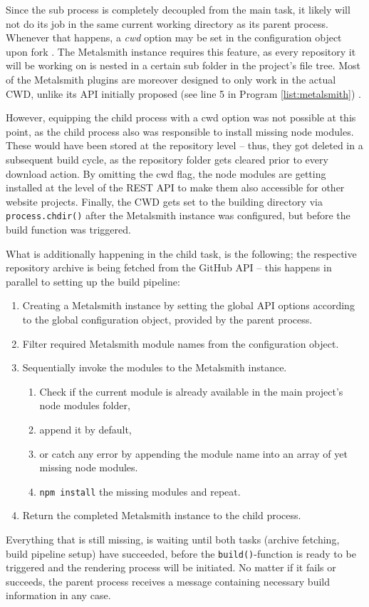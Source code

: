 Since the sub process is completely decoupled from the main task, it likely will not do its job in the same current working directory as its parent process. Whenever that happens, a \emph{cwd} option may be set in the configuration object upon fork \cite{NodejsChildProcesses}. The Metalsmith instance requires this feature, as every repository it will be working on is nested in a certain sub folder in the project's file tree. Most of the Metalsmith plugins are moreover designed to only work in the actual CWD, unlike its API initially proposed (see line 5 in Program \ref{list:metalsmith}) \cite{MetalsmithRepository}.

However, equipping the child process with a cwd option was not possible at this point, as the child process also was responsible to install missing node modules. These would have been stored at the repository level -- thus, they got deleted in a subsequent build cycle, as the repository folder gets cleared prior to every download action. By omitting the cwd flag, the node modules are getting installed at the level of the REST API to make them also accessible for other website projects. Finally, the CWD gets set to the building directory via \texttt{process.chdir()} after the Metalsmith instance was configured, but before the build function was triggered.

What is additionally happening in the child task, is the following; the respective repository archive is being fetched from the GitHub API -- this happens in parallel to setting up the build pipeline:

\begin{enumerate}
  \item Creating a Metalsmith instance by setting the global API options according to the global configuration object, provided by the parent process.
  \item Filter required Metalsmith module names from the configuration object.
  \item Sequentially invoke the modules to the Metalsmith instance.
  \begin{enumerate}
    \item Check if the current module is already available in the main project's node modules folder,
    \item append it by default,
    \item or catch any error by appending the module name into an array of yet missing node modules.
    \item \texttt{npm install} the missing modules and repeat.
  \end{enumerate}
  \item Return the completed Metalsmith instance to the child process.
\end{enumerate}
Everything that is still missing, is waiting until both tasks (archive fetching, build pipeline setup) have succeeded, before the \texttt{build()}-function is ready to be triggered and the rendering process will be initiated. No matter if it fails or succeeds, the parent process receives a message containing necessary build information in any case.

